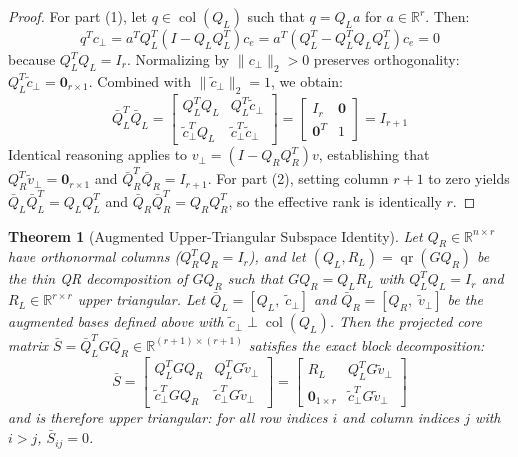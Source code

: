 \documentclass[10pt,twocolumn,letterpaper]{article}
\newtheorem{theorem}{Theorem}
\begin{document}
\begin{proof}
For part (1), let $q \in \operatorname{col}(Q_L)$ such that $q = Q_L a$ for $a \in \mathbb{R}^{r}$. Then:
\begin{equation}
    q^T c_\perp = a^T Q_L^T (I - Q_L Q_L^T) c_e = a^T (Q_L^T - Q_L^T Q_L Q_L^T) c_e = 0
\end{equation}
because $Q_L^T Q_L = I_r$. Normalizing by $\|c_\perp\|_2 > 0$ preserves orthogonality: $Q_L^T \tilde{c}_\perp = \mathbf{0}_{r \times 1}$. Combined with $\|\tilde{c}_\perp\|_2 = 1$, we obtain:
\begin{equation}
    \bar{Q}_L^T \bar{Q}_L = \begin{bmatrix} Q_L^T Q_L & Q_L^T \tilde{c}_\perp \\ \tilde{c}_\perp^T Q_L & \tilde{c}_\perp^T \tilde{c}_\perp \end{bmatrix} = \begin{bmatrix} I_r & \mathbf{0} \\ \mathbf{0}^T & 1 \end{bmatrix} = I_{r+1}
\end{equation}
Identical reasoning applies to $v_\perp = (I - Q_R Q_R^T) v$, establishing that $Q_R^T \tilde{v}_\perp = \mathbf{0}_{r \times 1}$ and $\bar{Q}_R^T \bar{Q}_R = I_{r+1}$.
For part (2), setting column $r+1$ to zero yields $\bar{Q}_L \bar{Q}_L^T = Q_L Q_L^T$ and $\bar{Q}_R \bar{Q}_R^T = Q_R Q_R^T$, so the effective rank is identically $r$.
\end{proof}

\begin{theorem}[Augmented Upper-Triangular Subspace Identity]
\label{thm:augmented_triu}
Let $Q_R \in \mathbb{R}^{n \times r}$ have orthonormal columns ($Q_R^T Q_R = I_r$), and let $(Q_L, R_L) = \operatorname{qr}(G Q_R)$ be the thin QR decomposition of $G Q_R$ such that $G Q_R = Q_L R_L$ with $Q_L^T Q_L = I_r$ and $R_L \in \mathbb{R}^{r \times r}$ upper triangular.
Let $\bar{Q}_L = [Q_L, \; \tilde{c}_\perp]$ and $\bar{Q}_R = [Q_R, \; \tilde{v}_\perp]$ be the augmented bases defined above with $\tilde{c}_\perp \perp \operatorname{col}(Q_L)$.
Then the projected core matrix $\bar{S} = \bar{Q}_L^T G \bar{Q}_R \in \mathbb{R}^{(r+1) \times (r+1)}$ satisfies the exact block decomposition:
\begin{equation}
    \bar{S} = \begin{bmatrix} Q_L^T G Q_R & Q_L^T G \tilde{v}_\perp \\ \tilde{c}_\perp^T G Q_R & \tilde{c}_\perp^T G \tilde{v}_\perp \end{bmatrix} = \begin{bmatrix} R_L & Q_L^T G \tilde{v}_\perp \\ \mathbf{0}_{1 \times r} & \tilde{c}_\perp^T G \tilde{v}_\perp \end{bmatrix}
\end{equation}
and is therefore upper triangular: for all row indices $i$ and column indices $j$ with $i > j$, $\bar{S}_{ij} = 0$.
\end{theorem}
\end{document}
